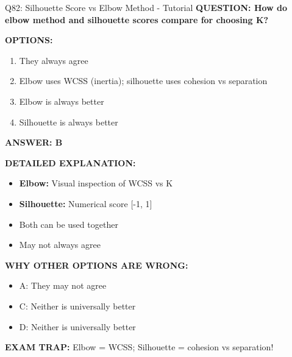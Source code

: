 \documentclass[8pt]{beamer}
\begin{document}
	\begin{frame}{Q82: Silhouette Score vs Elbow Method - Tutorial}
		\fontsize{6.5}{7.5}\selectfont
		\textbf{QUESTION: How do elbow method and silhouette scores compare for choosing K?}
		
		\vspace{0.1cm}
		\textbf{OPTIONS:}
		\begin{enumerate}
			\item They always agree
			\item Elbow uses WCSS (inertia); silhouette uses cohesion vs separation
			\item Elbow is always better
			\item Silhouette is always better
		\end{enumerate}
		
		\vspace{0.1cm}
		\textcolor{myblue}{\textbf{ANSWER: B}}
		
		\vspace{0.1cm}
		\textbf{DETAILED EXPLANATION:}
		\begin{itemize}
			\item \textbf{Elbow:} Visual inspection of WCSS vs K
			\item \textbf{Silhouette:} Numerical score [-1, 1]
			\item Both can be used together
			\item May not always agree
		\end{itemize}
		
		\vspace{0.1cm}
		\textcolor{myred}{\textbf{WHY OTHER OPTIONS ARE WRONG:}}
		\begin{itemize}
			\item \textcolor{myred}{A:} They may not agree
			\item \textcolor{myred}{C:} Neither is universally better
			\item \textcolor{myred}{D:} Neither is universally better
		\end{itemize}
		
		\textcolor{myred}{\textbf{EXAM TRAP:}} Elbow = \textcolor{myblue}{WCSS}; Silhouette = \textcolor{myblue}{cohesion vs separation}!
	\end{frame}
	
\end{document}
